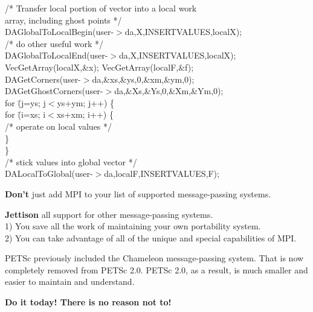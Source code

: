 {\small
\begin{tabbing}
          /* Transfer local portion of vector into a local work \\
             array, including ghost points */\\
          DAGlobalToLocalBegin(user-$>$da,X,INSERTVALUES,localX);\\
          /* do other useful work */\\
          DAGlobalToLocalEnd(user-$>$da,X,INSERTVALUES,localX);\\
          VecGetArray(localX,\&x); VecGetArray(localF,\&f);\\
          DAGetCorners(user-$>$da,\&xs,\&ys,0,\&xm,\&ym,0);\\
          DAGetGhostCorners(user-$>$da,\&Xs,\&Ys,0,\&Xm,\&Ym,0);\\
          for \= (j=ys; j$<$ys+ym; j++) \{\\
    \>        for \= (i=xs; i$<$xs+xm; i++) \{\\
    \> \>           /* operate on local values */\\
    \>        \}\\
          \}\\
          /* stick values into global vector */\\
          DALocalToGlobal(user-$>$da,localF,INSERTVALUES,F);
\end{tabbing}}
\ve



{\bf Don't} just add MPI to your list of supported 
message-passing systems.

{\bf Jettison} all support for other message-passing systems.\\
1) You save all the work of maintaining your own portability system.\\
2) You can take advantage of all of the unique and special 
   capabilities of MPI. 

PETSc previously included the Chameleon message-passing system. That is
now completely removed from PETSc 2.0. PETSc 2.0, as a result, is 
much smaller and easier to maintain and understand.
 
{\bf Do it today! There is no reason not to!}
\ve



